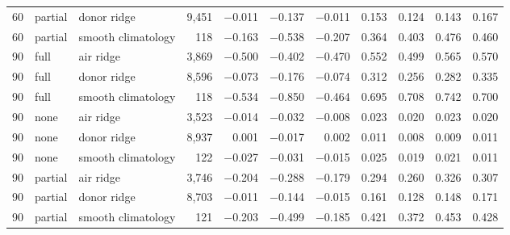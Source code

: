 \begin{table}
{\begin{tabular}{rllrrrrrrrr}
60 & partial & donor ridge & 9{,}451 & \ensuremath{-}0.011 & \ensuremath{-}0.137 & \ensuremath{-}0.011 & 0.153 & 0.124 & 0.143 & 0.167 \\
60 & partial & smooth climatology & 118 & \ensuremath{-}0.163 & \ensuremath{-}0.538 & \ensuremath{-}0.207 & 0.364 & 0.403 & 0.476 & 0.460 \\
90 & full & air ridge & 3{,}869 & \ensuremath{-}0.500 & \ensuremath{-}0.402 & \ensuremath{-}0.470 & 0.552 & 0.499 & 0.565 & 0.570 \\
90 & full & donor ridge & 8{,}596 & \ensuremath{-}0.073 & \ensuremath{-}0.176 & \ensuremath{-}0.074 & 0.312 & 0.256 & 0.282 & 0.335 \\
90 & full & smooth climatology & 118 & \ensuremath{-}0.534 & \ensuremath{-}0.850 & \ensuremath{-}0.464 & 0.695 & 0.708 & 0.742 & 0.700 \\
90 & none & air ridge & 3{,}523 & \ensuremath{-}0.014 & \ensuremath{-}0.032 & \ensuremath{-}0.008 & 0.023 & 0.020 & 0.023 & 0.020 \\
90 & none & donor ridge & 8{,}937 & 0.001 & \ensuremath{-}0.017 & 0.002 & 0.011 & 0.008 & 0.009 & 0.011 \\
90 & none & smooth climatology & 122 & \ensuremath{-}0.027 & \ensuremath{-}0.031 & \ensuremath{-}0.015 & 0.025 & 0.019 & 0.021 & 0.011 \\
90 & partial & air ridge & 3{,}746 & \ensuremath{-}0.204 & \ensuremath{-}0.288 & \ensuremath{-}0.179 & 0.294 & 0.260 & 0.326 & 0.307 \\
90 & partial & donor ridge & 8{,}703 & \ensuremath{-}0.011 & \ensuremath{-}0.144 & \ensuremath{-}0.015 & 0.161 & 0.128 & 0.148 & 0.171 \\
90 & partial & smooth climatology & 121 & \ensuremath{-}0.203 & \ensuremath{-}0.499 & \ensuremath{-}0.185 & 0.421 & 0.372 & 0.453 & 0.428 \\
\bottomrule
\end{tabular}
}
\end{table}

